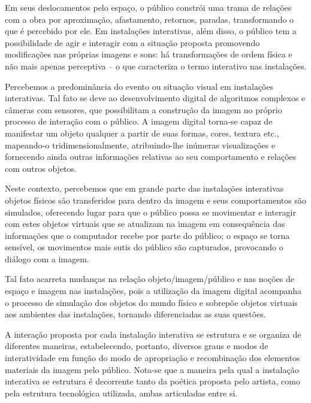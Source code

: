 Em seus deslocamentos pelo espaço, o público constrói uma trama de relações com a obra por aproximação, afastamento, retornos, paradas, transformando o que é percebido por ele. Em instalações interativas, além disso, o público tem a possibilidade de agir e interagir com a situação proposta promovendo modificações nas próprias imagens e sons:  há transformações de ordem física e não mais apenas perceptiva – o que caracteriza o termo interativo nas instalações.  \cite[p. 6]{bochio}

Percebemos a predominância do evento ou situação visual em instalações interativas. Tal fato se deve ao desenvolvimento digital de algoritmos complexos e câmeras com sensores, que possibilitam a construção da imagem no próprio processo de interação com o público. A imagem digital torna-se capaz de manifestar um objeto qualquer a partir de suas formas, cores, textura etc., mapeando-o tridimensionalmente, atribuindo-lhe inúmeras visualizações e fornecendo ainda outras informações relativas ao seu comportamento e relações com outros objetos. \cite[p. 6]{bochio}

Neste contexto, percebemos que em grande parte das instalações interativas objetos físicos são transferidos para dentro da imagem e seus comportamentos são simulados, oferecendo lugar para que o público possa se movimentar e interagir com estes objetos virtuais que se atualizam na imagem em consequência das informações que o computador recebe por parte do público; o espaço se torna sensível, os movimentos mais sutis do público são capturados, provocando o diálogo com a imagem. \cite[p. 6]{bochio}

Tal fato acarreta mudanças na relação objeto/imagem/público e nas noções de espaço e imagem nas instalações, pois a utilização da imagem digital acompanha o processo de simulação dos objetos do mundo físico e sobrepõe objetos virtuais aos ambientes das instalações, tornando diferenciadas as suas questões. \cite[p. 6]{bochio}

A interação proposta por cada instalação interativa se estrutura e se organiza de diferentes maneiras, estabelecendo, portanto, diversos graus e modos de interatividade em função do modo de apropriação e recombinação dos elementos materiais da imagem
pelo público. Nota-se que a maneira pela qual a instalação interativa se estrutura é decorrente tanto da poética proposta pelo artista, como pela estrutura tecnológica utilizada, ambas articuladas entre si. \cite[p. 6-7]{bochio}


